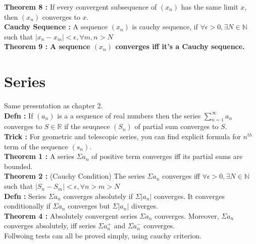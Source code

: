\documentclass{report}
\begin{document}
\noindent \textbf{Theorem 8 :} If every convergent subsequence of $(x_n)$ has the same limit $x$, then $(x_n)$ converges to $x$.\\

\noindent \textbf{Cauchy Sequence :} A sequence $(x_n)$ is cauchy sequence, if $\forall \epsilon > 0, \exists N \in \mathbb{N}$ such that $|x_n - x_m| < \epsilon , \forall m,n> N$\\

\noindent \textbf{Theorem 9 :} \textbf{A sequence $(x_n)$ converges iff it's a Cauchy sequence.}\\




\chapter{Series}
Same presentation as chapter 2.\\

\noindent \textbf{Defn : }If $(a_n)$ is a a sequence of real numbers then the series $\sum_{n=1}^{\infty}a_n$  converges to $S \in \mathbb{R}$ if the seuqnece $(S_n)$ of partial sum converges to $S$.\\

\noindent \textbf{Trick : } For geometric and telescopic series, you can find explicit formula for $n^{th}$ term of the sequence $(s_n)$.\\

\noindent \textbf{Theorem 1 :} A series $\Sigma a_n$ of positive term converges iff its partial sums are bounded.\\

\noindent \textbf{Theorem 2 :} (Cauchy Condition) The series $\Sigma a_n$ converges iff $\forall \epsilon > 0, \exists N \in \mathbb{N}$ such that $|S_n - S_m| < \epsilon, \forall n > m > N$\\

\noindent \textbf{Defn :} Series $\Sigma a_n$ converges absolutely if $\Sigma |a_n|$ converges. It converges conditionally if $\Sigma a_n$ converges but $\Sigma |a_n|$ diverges.\\

\noindent \textbf{Theorem 4 :} Absolutely convergent series $\Sigma a_n$ converges. Moreover, $\Sigma a_n$ converges absolutely, iff series $\Sigma a_n^{+}$ and $\Sigma a_n^{-}$ converges.\\

Follwoing tests can all be proved simply, using cauchy criterion.\\
\end{document}

